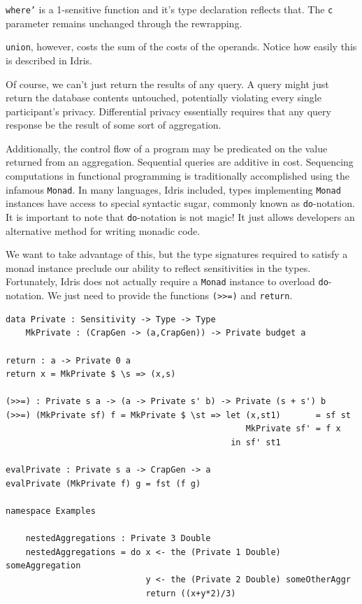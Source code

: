 \documentclass[12pt]{article}
\begin{document}
\texttt{where'} is a 1-sensitive function and it's type declaration reflects that.
The \texttt{c} parameter remains unchanged through the rewrapping.

\texttt{union}, however, costs the sum of the costs of the operands.
Notice how easily this is described in Idris.

Of course, we can't just return the results of any query.
A query might just return the database contents untouched, potentially violating every single participant's privacy.
Differential privacy essentially requires that any query response be the result of some sort of aggregation.

Additionally, the control flow of a program may be predicated on the value returned from an aggregation.
Sequential queries are additive in cost.
Sequencing computations in functional programming is traditionally accomplished using the infamous \texttt{Monad}.
In many languages, Idris included, types implementing \texttt{Monad} instances have access to special syntactic sugar, commonly known as \texttt{do}-notation.
It is important to note that \texttt{do}-notation is not magic!
It just allows developers an alternative method for writing monadic code.

We want to take advantage of this, but the type signatures required to satisfy a monad instance preclude our ability to reflect sensitivities in the types.
Fortunately, Idris does not actually require a \texttt{Monad} instance to overload \texttt{do}-notation.
We just need to provide the functions \texttt{(>>=)} and \texttt{return}.

\begin{lstlisting}
data Private : Sensitivity -> Type -> Type
    MkPrivate : (CrapGen -> (a,CrapGen)) -> Private budget a

return : a -> Private 0 a
return x = MkPrivate $ \s => (x,s)

(>>=) : Private s a -> (a -> Private s' b) -> Private (s + s') b
(>>=) (MkPrivate sf) f = MkPrivate $ \st => let (x,st1)       = sf st
                                                MkPrivate sf' = f x
                                             in sf' st1

evalPrivate : Private s a -> CrapGen -> a
evalPrivate (MkPrivate f) g = fst (f g)

namespace Examples

    nestedAggregations : Private 3 Double
    nestedAggregations = do x <- the (Private 1 Double) someAggregation
                            y <- the (Private 2 Double) someOtherAggr
                            return ((x+y*2)/3)
\end{lstlisting}
\end{document}
